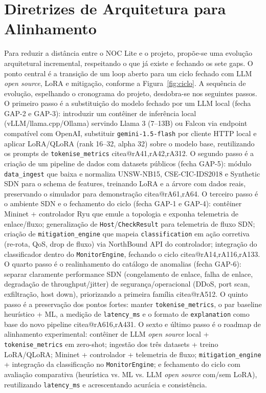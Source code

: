 \documentclass[12pt,a4paper]{article}
\makeatletter
\newcommand{\citea}[1]{\begingroup\edef\@currentlabel{\csname citea@#1\endcsname}\@currentlabel\endgroup}
\makeatother
\begin{document}
\section{Diretrizes de Arquitetura para Alinhamento}
\label{sec:diretrizes}

Para reduzir a distância entre o NOC Lite e o projeto, propõe-se uma evolução
arquitetural incremental, respeitando o que já existe e fechando os sete gaps.
O ponto central é a transição de um loop aberto para um ciclo fechado com LLM
\textit{open source}, LoRA e mitigação, conforme a Figura~\ref{fig:ciclo}. A
sequência de evolução, espelhando o cronograma do projeto, desdobra-se nos
seguintes passos. O primeiro passo é a substituição do modelo fechado por um
LLM local (fecha GAP-2 e GAP-3): introduzir um contêiner de inferência local
(vLLM/llama.cpp/Ollama) servindo Llama 3 (7--13B) ou Falcon via endpoint
compatível com OpenAI, substituir \texttt{gemini-1.5-flash} por cliente HTTP
local e aplicar LoRA/QLoRA (rank 16--32, alpha 32) sobre o modelo base,
reutilizando os prompts de \texttt{tokenise\_metrics} \citea{rA41,rA42,rA312}.
O segundo passo é a criação de um pipeline de dados com datasets públicos
(fecha GAP-5): módulo \texttt{data\_ingest} que baixa e normaliza UNSW-NB15,
CSE-CIC-IDS2018 e Synthetic SDN para o schema de features, treinando LoRA e a
árvore com dados reais, preservando o simulador para demonstração
\citea{rA61,rA64}. O terceiro passo é o ambiente SDN e o fechamento do ciclo
(fecha GAP-1 e GAP-4): contêiner Mininet + controlador Ryu que emule a
topologia e exponha telemetria de enlace/fluxo; generalização de
\texttt{Host}/\texttt{CheckResult} para telemetria de fluxo SDN; criação de
\texttt{mitigation\_engine} que mapeia \texttt{classification} em ação
corretiva (re-rota, QoS, drop de fluxo) via NorthBound API do controlador;
integração do classificador dentro do \texttt{MonitorEngine}, fechando o
ciclo \citea{rA14,rA116,rA133}. O quarto passo é o realinhamento do catálogo
de anomalias (fecha GAP-6): separar claramente performance SDN
(congelamento de enlace, falha de enlace, degradação de throughput/jitter) de
segurança/operacional (DDoS, port scan, exfiltração, host down), priorizando
a primeira família \citea{rA512}. O quinto passo é a preservação dos pontos
fortes: manter \texttt{tokenise\_metrics}, o par baseline heurístico + ML, a
medição de \texttt{latency\_ms} e o formato de \texttt{explanation} como base
do novo pipeline \citea{rA616,rA431}. O sexto e último passo é o roadmap de
alinhamento experimental: contêiner de LLM \textit{open source} local +
\texttt{tokenise\_metrics} em zero-shot; ingestão dos três datasets + treino
LoRA/QLoRA; Mininet + controlador + telemetria de fluxo;
\texttt{mitigation\_engine} + integração da classificação no
\texttt{MonitorEngine}; e fechamento do ciclo com avaliação comparativa
(heurística vs. ML vs. LLM \textit{open source} com/sem LoRA), reutilizando
\texttt{latency\_ms} e acrescentando acurácia e consistência.
\end{document}
